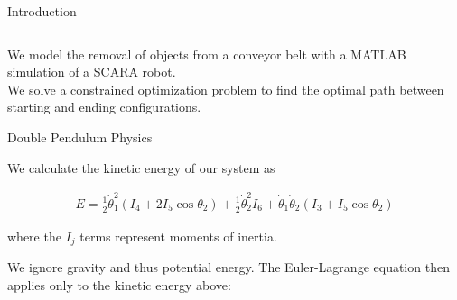 \documentclass[final]{beamer}
\begin{document}
\begin{frame}{}
{\begin{columns}[t]
\begin{column}{.30\linewidth}
\begin{block}{\centering Introduction}
\begin{columns}[T]
\end{columns}

\vspace{0.3cm}



We model the removal of objects from a conveyor belt with a MATLAB simulation of a SCARA robot.\\

We solve a constrained optimization problem to find the optimal path between starting and
ending configurations. \\
 
\end{block}
                
                

\begin{block}{\centering Double Pendulum Physics} 

We calculate the kinetic energy of our system as
	
\begin{align*}
	E = \frac{1}{2}\dot\theta_1^2(I_4 + 2I_5\cos\theta_2)
	+ \frac{1}{2}\dot\theta_2^2I_6
	+ \dot\theta_1\dot\theta_2(I_3 + I_5 \cos\theta_2)
\end{align*}

where the $I_j$ terms represent moments of inertia. 

We ignore gravity and thus potential energy. The Euler-Lagrange equation then applies
only to the kinetic energy above:


\end{block}
\end{column}
\end{columns}}
\end{frame}
\end{document}
